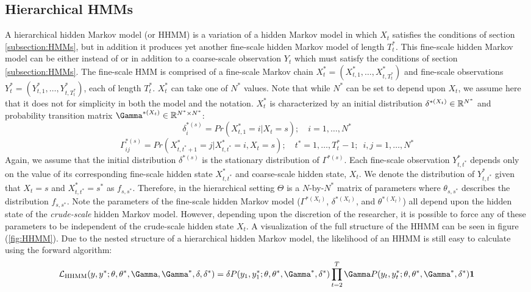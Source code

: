 \subsection{Hierarchical HMMs}

A hierarchical hidden Markov model (or HHMM) is a variation of a hidden Markov model in which $X_t$ satisfies the conditions of section \ref{subsection:HMMs}, but in addition it produces yet another fine-scale hidden Markov model of length $T_t^*$. This fine-scale hidden Markov model can be either instead of \cite{Barajas:2017} or in addition to \cite{Adam:2019} a coarse-scale observation $Y_t$ which must satisfy the conditions of section \ref{subsection:HMMs}. The fine-scale HMM is comprised of a fine-scale Markov chain $X^*_t = (X^*_{t,1}, \ldots, X^*_{t,T^*_t})$ and fine-scale observations $Y^*_t = (Y^*_{t,1}, \ldots, Y^*_{t,T^*_t})$, each of length $T^*_t$. $X^*_t$ can take one of $N^*$ values. Note that while $N^*$ can be set to depend upon $X_t$, we assume here that it does not for simplicity in both the model and the notation. $X^*_t$ is characterized by an initial distribution $\delta^{*(X_t)} \in \mathbb{R}^{N^*}$ and probability transition matrix $\Gamma^{*(X_t)} \in \bbR^{N^* \times N^*}$:
%
$$\delta^{*(s)}_i = Pr(X^*_{t,1} = i | X_t = s); \quad i = 1,\ldots,N^*$$
%
$$\Gamma^{*(s)}_{ij} = Pr(X^*_{t,t^*+1} = j | X^*_{t,t^*} = i, X_t = s); \quad t^* = 1, \ldots, T^*_t-1; \enspace i,j = 1,\ldots,N^*$$
%
Again, we assume that the initial distribution $\delta^{*(s)}$ is the stationary distribution of $\Gamma^{*(s)}$. Each fine-scale observation $Y^*_{t,t^*}$ depends only on the value of its corresponding fine-scale hidden state $X^*_{t,t^*}$ and coarse-scale hidden state, $X_t$. We denote the distribution of $Y^*_{t,t^*}$ given that $X_t = s$ and $X^*_{t,t^*} = s^*$ as $f_{s,s^*}$. Therefore, in the hierarchical setting $\Theta$ is a $N$-by-$N^*$ matrix of parameters where $\theta_{s,s^*}$ describes the distribution $f_{s,s^*}$. Note the parameters of the fine-scale hidden Markov model ($\Gamma^{*(X_t)}$, $\delta^{*(X_t)}$, and $\theta^{*(X_t)}$) all depend upon the hidden state of the \textit{crude-scale} hidden Markov model. However, depending upon the discretion of the researcher, it is possible to force any of these parameters to be independent of the crude-scale hidden state $X_t$. A visualization of the full structure of the HHMM can be seen in figure (\ref{fig:HHMM}). Due to the nested structure of a hierarchical hidden Markov model, the likelihood of an HHMM is still easy to calculate using the forward algorithm:
%
$$\calL_{\text{HHMM}}(y,y^*;\theta,\theta^*,\Gamma,\Gamma^*,\delta,\delta^*) = \delta P(y_1,y_1^*;\theta,\theta^*,\Gamma^*,\delta^*) \prod_{t=2}^T \Gamma P(y_t,y_t^*;\theta,\theta^*,\Gamma^*,\delta^*) \mathbf{1}$$
